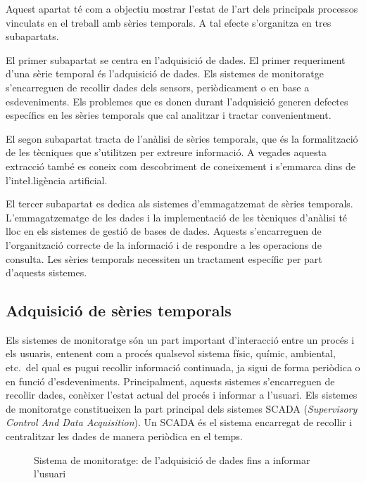 Aquest apartat té com a objectiu mostrar l'estat de l'art dels
principals processos vinculats en el treball amb sèries temporals. A
tal efecte s'organitza en tres subapartats.
 

El primer subapartat se centra en l'adquisició de dades. El primer
requeriment d'una sèrie temporal és l'adquisició de dades. Els
sistemes de monitoratge s'encarreguen de recollir dades dels sensors,
periòdicament o en base a esdeveniments.  Els problemes que es donen
durant l'adquisició generen defectes específics en les sèries
temporals que cal analitzar i tractar convenientment.


El segon subapartat tracta de l'anàlisi de sèries temporals, que és
la formalització de les tècniques que s'utilitzen per extreure
informació. A vegades aquesta extracció també es coneix com
descobriment de coneixement i s'emmarca dins de l'inte\l.ligència
artificial.


El tercer subapartat es dedica als sistemes d'emmagatzemat de sèries
temporals. L'emmagatzematge de les dades i la implementació de les
tècniques d'anàlisi té lloc en els sistemes de gestió de bases de
dades. Aquests s'encarreguen de l'organització correcte de la
informació i de respondre a les operacions de consulta. Les sèries
temporals necessiten un tractament específic per part d'aquests
sistemes.






\subsection{Adquisició de sèries temporals}

Els sistemes de monitoratge són un part important d'interacció entre
un procés i els usuaris, entenent com a procés qualsevol sistema
físic, químic, ambiental, etc.\ del qual es pugui recollir informació
continuada, ja sigui de forma periòdica o en funció
d'esdeveniments. Principalment, aquests sistemes s'encarreguen de
recollir dades, conèixer l'estat actual del procés i informar a
l'usuari. Els sistemes de monitoratge constitueixen la part principal
dels sistemes SCADA (\emph{Supervisory Control And Data
  Acquisition}). Un SCADA és el sistema encarregat de recollir i
centralitzar les dades de manera periòdica en el temps.



\begin{figure}[tp]
  \begin{center}
    \scriptsize 
    
  \end{center}
  \caption{Sistema de monitoratge: de l'adquisició de dades fins a informar l'usuari}
  \label{fig:sistema_monitoratge}
\end{figure}


